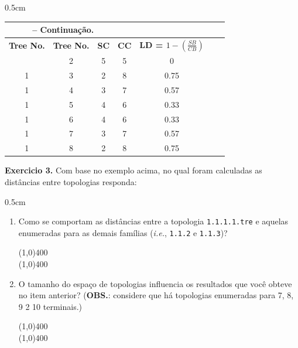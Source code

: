 \begin{refsection}
\begin {myindentpar}{0.5cm}
\begin{enumerate}[\itshape i.]
\begin{center}
\begin{longtable}{ccccccc}
\multicolumn{3}{c}{{\bfseries \tablename\ \thetable{} -- Continuação.}}\\
\hline\hline \textbf{Tree No.} & \textbf{Tree No.} & \textbf{SC} & \textbf{CC} & \textbf{LD = $1-(\frac{SB}{CB})$}\\

\endhead
\hline \hline
\endlastfoot
1 & 2 & 5 & 5 & 0\\
1 & 3 & 2 & 8 & 0.75\\
1 & 4 & 3 & 7 & 0.57\\
1 & 5 & 4 & 6 & 0.33\\
1 & 6 & 4 & 6 & 0.33\\
1 & 7 & 3 & 7 & 0.57\\
1 & 8 & 2 & 8 & 0.75\\

\end{longtable}
\end{center}


\end{enumerate}
\end{myindentpar}

\begin{blackBlock}{\textbf{Exercicio 3.}}\label{tut3:ex:3.\arabic{ex}}
	Com base no exemplo acima, no qual foram calculadas as distâncias entre topologias responda:
\begin {myindentpar}{0.5cm}
\begin{enumerate}[\itshape i.]
 \item{Como se comportam as distâncias entre a topologia \texttt{1.1.1.1.tre} e aquelas enumeradas para as demais famílias (\textit{i.e.}, \texttt{1.1.2} e \texttt{1.1.3})?}\label{tut3:ex2}\\
  \begin{center}
  \line(1,0){400}\\
  \line(1,0){400}\\
  \end{center}

 \item{O tamanho do espaço de topologias influencia os resultados que você obteve no item anterior? (\textbf{OBS.}: considere que há topologias enumeradas para 7, 8, 9 2 10 terminais.)}\label{tut3:ex2}\\
  \begin{center}
  \line(1,0){400}\\
  \line(1,0){400}\\
  \end{center}


\end{enumerate}
\end{myindentpar}
\end{blackBlock}
\end{refsection}
